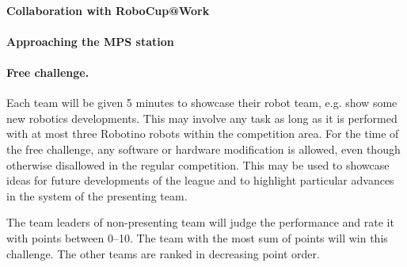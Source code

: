 \documentclass[12pt,twoside]{article}
\begin{document}
\paragraph{Collaboration with RoboCup@Work~} 
  

\paragraph{Approaching the MPS station~} 
  

\paragraph{Free challenge.~}
Each team will be given 5 minutes to showcase their robot team, e.g.
show some new robotics developments. This may involve any task as long
as it is performed with at most three Robotino robots within the
competition area. For the time of the free challenge, any software or
hardware modification is allowed, even though otherwise disallowed in
the regular competition. This may be used to showcase ideas for future
developments of the league and to highlight particular advances in the
system of the presenting team.

The team leaders of non-presenting team will judge the performance and
rate it with points between 0--10.  The team with the most sum of
points will win this challenge. The other teams are ranked in
decreasing point order.
\end{document}
